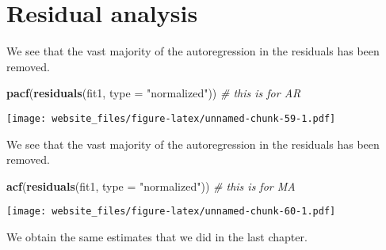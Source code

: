 \documentclass[]{book}
\newenvironment{Shaded}{\begin{snugshade}}{\end{snugshade}}
\newcommand{\KeywordTok}[1]{\textcolor[rgb]{0.13,0.29,0.53}{\textbf{#1}}}
\newcommand{\DataTypeTok}[1]{\textcolor[rgb]{0.13,0.29,0.53}{#1}}
\newcommand{\StringTok}[1]{\textcolor[rgb]{0.31,0.60,0.02}{#1}}
\newcommand{\CommentTok}[1]{\textcolor[rgb]{0.56,0.35,0.01}{\textit{#1}}}
\newcommand{\NormalTok}[1]{#1}
\begin{document}
\newpage

\section{Residual analysis}\label{residual-analysis-3}

We see that the vast majority of the autoregression in the residuals has
been removed.

\begin{Shaded}
\begin{Highlighting}[]
\KeywordTok{pacf}\NormalTok{(}\KeywordTok{residuals}\NormalTok{(fit1, }\DataTypeTok{type =} \StringTok{"normalized"}\NormalTok{)) }\CommentTok{# this is for AR}
\end{Highlighting}
\end{Shaded}

\texttt{[image: website\_files/figure-latex/unnamed-chunk-59-1.pdf]}

\newpage

We see that the vast majority of the autoregression in the residuals has
been removed.

\begin{Shaded}
\begin{Highlighting}[]
\KeywordTok{acf}\NormalTok{(}\KeywordTok{residuals}\NormalTok{(fit1, }\DataTypeTok{type =} \StringTok{"normalized"}\NormalTok{)) }\CommentTok{# this is for MA}
\end{Highlighting}
\end{Shaded}

\texttt{[image: website\_files/figure-latex/unnamed-chunk-60-1.pdf]}

\newpage

We obtain the same estimates that we did in the last chapter.
\end{document}
